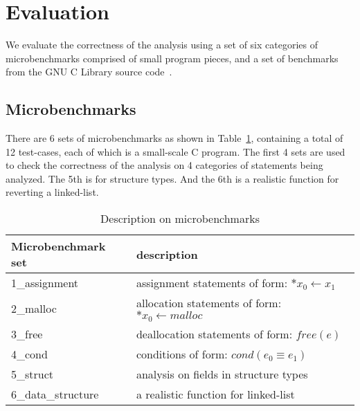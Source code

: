 \section{Evaluation}
\label{s:evaluation}

We evaluate the correctness of the analysis using a set of six categories of 
microbenchmarks comprised of small program pieces, and a set of benchmarks 
from the GNU C Library source code~\cite{glibc}.

\subsection{Microbenchmarks}
\label{microbenchmark}

There are 6 sets of microbenchmarks as shown in Table~\ref{tbl:micro}, 
containing a total of 12 test-cases, each of which is a small-scale C program.
The first 4 sets are used to check the correctness of the analysis on 4 
categories of statements being analyzed. The 5th is for  
structure types. And the 6th is a realistic function for reverting a linked-list.



\begin{table}[t!]
  \centering
    \begin{tabular}{|l|l|}
    \hline
    Microbenchmark set & description\\
    \hline
    \hline
    1\_assignment & assignment statements of form: $*x_0\gets x_1$ \\
    \hline
    2\_malloc & allocation statements of form: $*x_0\gets malloc$ \\
    \hline
    3\_free & deallocation statements of form: $free(e)$ \\
    \hline
    4\_cond & conditions of form: $cond(e_0\equiv e_1)$ \\
    \hline
    5\_struct & analysis on fields in structure types \\
    \hline
    6\_data\_structure & a realistic function for linked-list \\
    \hline
    \end{tabular}
    \caption{\label{tbl:micro} Description on microbenchmarks}
\end{table}

